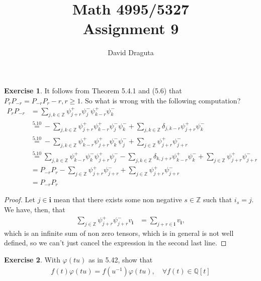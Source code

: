 \documentclass[12pt]{extarticle}
\title{ Math 4995/5327
  \\
  Assignment 9}
\author{David Draguta}
\newcommand{\Q}{\mathbb{Q}}
\newcommand{\Z}{\mathbb{Z}}
\newcommand{\<}{\langle}
\renewcommand{\>}{\rangle}
\theoremstyle{definition}
\newtheorem{exercise}{Exercise}
\begin{document}
\maketitle

\begin{exercise}
  It follows from Theorem 5.4.1 and (5.6) that $P_{r}P_{-r} = P_{-r}P_r - r, r \geq 1.$ So what is wrong with the following computation?
  \begin{align*}
    P_r P_{-r}
    &= \sum\limits_{j,k \in \Z} \psi_{j+r}^+ \psi_{j}^-\psi_{k-r}^+\psi_k^- \\
    &\overset{5.10}{=} - \sum\limits_{j,k \in \Z} \psi_{j+r}^+\psi_{k-r}^+\psi_j^-\psi_k^- + \sum\limits_{j,k \in \Z} \delta_{j,k-r}\psi_{j+r}^+\psi_k^- \\
    &\overset{5.10}{=} - \sum\limits_{j,k \in \Z} \psi_{k-r}^+\psi_{j+r}^+\psi_k^-\psi_j^- + \sum\limits_{j \in \Z} \psi_{j+r}^+\psi_{j+r}^- \\
    &\overset{5.10}{=} \sum\limits_{j,k \in \Z} \psi_{k-r}^+\psi_{k}^-\psi_{j+r}^+\psi_j^- - \sum\limits_{j,k \in \Z} \delta_{k,j+r}\psi_{k-r}^+\psi_k^- + \sum\limits_{j \in \Z} \psi_{j+r}^+ \psi_{j+r}^- \\
    &= P_{-r}P_{r} - \sum\limits_{j \in \Z} \psi_{j +r}^+\psi_{j+r}^- + \sum\limits_{j \in \Z} \psi_{j+r}^+\psi_{j+r}^-  \\
    &= P_{-r}P_{r}
  \end{align*}
\end{exercise}
\begin{proof}
  Let $j \in \mathbf{i}$ mean that there exists some non negative $s \in \Z$ such that $i_s = j$. We have, then, that  
  \begin{align*}
    \sum\limits_{j \in \Z} \psi_{j +r}^+\psi_{j+r}^- v_{\mathbf{i}}
    &=
    \sum\limits_{j+r \in \mathbf{i}} v_{\mathbf{i}},
  \end{align*}
  which is an infinite sum of non zero tensors, which is in general is not well defined, so we can't just cancel the expression in the second last line.
\end{proof}

\begin{exercise}
  With $\varphi(tu)$ as in 5.42, show that
  \begin{align*}
    f(t)\varphi(tu) = f(u^{-1})\varphi(tu), \quad \forall f(t) \in \Q[t]
  \end{align*}
\end{exercise}
\end{document}
